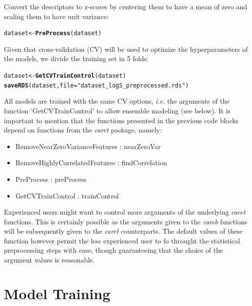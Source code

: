 \documentclass[twoside,a4wide,12pt]{article}\usepackage[]{graphicx}\usepackage[]{color}
\makeatletter
\newcommand{\hlstr}[1]{\textcolor[rgb]{0.192,0.494,0.8}{#1}}%
\newcommand{\hlstd}[1]{\textcolor[rgb]{0.345,0.345,0.345}{#1}}%
\newcommand{\hlkwb}[1]{\textcolor[rgb]{0.69,0.353,0.396}{#1}}%
\newcommand{\hlkwc}[1]{\textcolor[rgb]{0.333,0.667,0.333}{#1}}%
\newcommand{\hlkwd}[1]{\textcolor[rgb]{0.737,0.353,0.396}{\textbf{#1}}}%
\newenvironment{kframe}{%
 \def\at@end@of@kframe{}%
 \ifinner\ifhmode%
  \def\at@end@of@kframe{\end{minipage}}%
  \begin{minipage}{\columnwidth}%
 \fi\fi%
 \def\FrameCommand##1{\hskip\@totalleftmargin \hskip-\fboxsep
 \colorbox{shadecolor}{##1}\hskip-\fboxsep
     \hskip-\linewidth \hskip-\@totalleftmargin \hskip\columnwidth}%
 \MakeFramed {\advance\hsize-\width
   \@totalleftmargin\z@ \linewidth\hsize
   \@setminipage}}%
 {\par\unskip\endMakeFramed%
 \at@end@of@kframe}
\newenvironment{knitrout}{}{} %
\makeatother
\begin{document}
Convert the descriptors to z-scores by centering them to have a mean of zero and scaling them to have unit variance:
\begin{knitrout}
\color{fgcolor}\begin{kframe}
\begin{alltt}
\hlstd{dataset} \hlkwb{<-} \hlkwd{PreProcess}\hlstd{(dataset)}
\end{alltt}
\end{kframe}
\end{knitrout}

Given that cross-validation (CV) will be used to optimize the hyperparameters of the models, we divide the training set in 5 folds:
\begin{knitrout}
\color{fgcolor}\begin{kframe}
\begin{alltt}
\hlstd{dataset} \hlkwb{<-} \hlkwd{GetCVTrainControl}\hlstd{(dataset)}
\hlkwd{saveRDS}\hlstd{(dataset,} \hlkwc{file} \hlstd{=} \hlstr{"dataset_logS_preprocessed.rds"}\hlstd{)}
\end{alltt}
\end{kframe}
\end{knitrout}

All models are trained with the same CV options, {\it i.e.} the arguments of the function 'GetCVTrainControl' to allow ensemble modeling (see below).
It is important to mention that the functions presented in the previous code blocks depend on functions from the {\it caret} package, namely: 
\begin{itemize}
\item RemoveNearZeroVarianceFeatures : nearZeroVar
\item RemoveHighlyCorrelatedFeatures : findCorrelation
\item PreProcess : preProcess
\item GetCVTrainControl : trainControl
\end{itemize}
Experienced users might want to control more arguments of the underlying {\it caret} functions.
This is certainly possible as the arguments given to the {\it camb} functions will be subsequently given to the {\it caret} counterparts.
The default values of these function however permit the less experienced user to fo throught the statistical preprocessing
steps with ease, though guaranteeing that the choice of the argument values is reasonable.

\section{Model Training}
\end{document}

